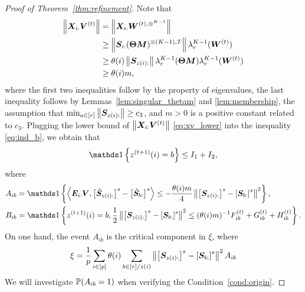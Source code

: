 \documentclass[lettersize,journal]{IEEEtran}
\theoremstyle{definition}
\theoremstyle{definition}
\newcommand{\off}[1]{\left[#1\right]}
\newcommand{\offf}[1]{\left\{#1\right\}}
\newcommand{\ang}[1]{\left\langle#1\right\rangle}
\begin{document}
\begin{proof}[Proof of Theorem~\ref{thm:refinement}]
   Note that 
    \begin{align}
        \onorm{\mX_{i:} \mV^{(t)}} &= \onorm{ \mX_{i:} \mW^{(t), \otimes^{K-1}}} \\
        &\geq \onorm{\mS_{i:} (\mTheta \mM)^{\otimes (K-1),T} } \lambda^{K-1}_r(\mW^{(t)}) \\
        & \geq \theta(i) \onorm{\mS_{z(i):}} \lambda_r^{K-1}(\mTheta \mM) \lambda^{K-1}_r(\mW^{(t)})\\
        & \geq\theta(i) m , \label{eq:xv_lower}
    \end{align}
    where the first two inequalities follow by the property of eigenvalues, the last inequality follows by Lemmas~\ref{lem:singular_thetam} and \ref{lem:membership}, the assumption that $\min_{a \in [r]} \left\lVert\bm S_{z(i):}\right\rVert \geq c_3$, and $m >0$ is a positive constant related to $ c_3$. Plugging the lower bound of $ \left\lVert\bm X_{i:} \bm{V}^{(t)}\right\rVert$ \eqref{eq:xv_lower} into the inequality \ref{eq:ind_b}, we obtain that 
    \begin{equation}\label{eq:decomp1}
        \ind \offf{ z^{(t+1)}(i) = b  } \leq I_1 + I_2,
    \end{equation}
    where 
    \begin{align}
        A_{ib} &= \ind \offf{\ang{ \mE_{i:} \mV, \off{  \tilde \mS_{z(i):} }^s - \off{  \tilde \mS_{b:} }^s }  \leq - \frac{\theta(i) m}{4} \onorm{ \off{ \mS_{z(i):}  }^s - \off{ \mS_{b:}  }^s  }^2 },\\
        B_{ib} &= \ind \offf{z^{(t+1)}(i) = b, \frac{1}{2}\onorm{ \off{ \mS_{z(i):}  }^s - \off{ \mS_{b:}  }^s  }^2 \leq (\theta(i) m)^{-1} F_{ib}^{(t)} + G_{ib}^{(t)} + H_{ib}^{(t)} }.
    \end{align}
    On one hand, the event $A_{ib}$ is the critical component in $\xi$, where
    \begin{equation}
        \xi =   \frac{1}{p} \sum_{i \in [p] } \theta(i) \sum_{b \in [r]/z(i)}  \onorm{ \off{ \mS_{ z(i):}  }^s - \off{ \mS_{b:}  }^s  }^2 A_{ib}
    \end{equation}
    We will investigate $\mathbb{P}(A_{ib} = 1)$ when verifying the Condition~\ref{cond:origin}. 
    

\end{proof}
\end{document}
